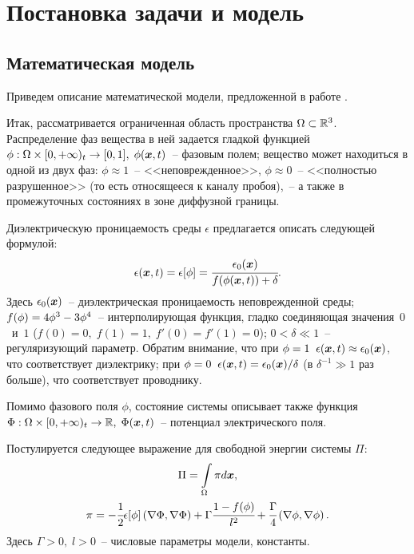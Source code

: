 
\section{Постановка задачи и модель}

\subsection{Математическая модель}

Приведем описание математической модели, предложенной в работе \cite{pitike_dielectric_breakdown}.

Итак, рассматривается ограниченная область пространства $\Omega \subset {\mathbb{R}}^3$. Распределение фаз вещества в ней задается гладкой функцией $\phi: \Omega \times [0, +\infty)_t \hm \to [0, 1], \; \phi(\vx, t)$~-- фазовым полем; вещество может находиться в одной из двух фаз: $\phi \approx 1$~-- <<неповрежденное>>, $\phi \approx 0$~-- <<полностью разрушенное>> (то есть относящееся к каналу пробоя),~-- а также в промежуточных состояниях в зоне диффузной границы.

Диэлектрическую проницаемость среды $\epsilon$ предлагается описать следующей формулой:
\begin{equation}
	\epsilon({\boldsymbol{x}}, t) = \epsilon[\phi] = \cfrac{\epsilon_0({\boldsymbol{x}})}{f(\phi({\boldsymbol{x}}, t)) + \delta} {\text{.}}
	\label{eq:epsilon}
\end{equation}
Здесь $\epsilon_0({\boldsymbol{x}})$~-- диэлектрическая проницаемость неповрежденной среды; $f(\phi) \hm = 4\phi^3 - 3\phi^4$~-- интерполирующая функция, гладко соединяющая значения~$0$~и~$1$ ($f(0) = 0, \; f(1) = 1, \; f'(0) = f'(1) = 0$); $0 < \delta \ll 1$~-- регуляризующий параметр. Обратим внимание, что при $\phi = 1 \;\; \epsilon({\boldsymbol{x}}, t) \approx \epsilon_0({\boldsymbol{x}})$, что соответствует диэлектрику; при $\phi = 0 \;\; \epsilon({\boldsymbol{x}}, t) = \epsilon_0({\boldsymbol{x}}) / \delta$ (в $\delta^{-1} \gg 1$ раз больше), что соответствует проводнику.

Помимо фазового поля $\phi$, состояние системы описывает также функция $\Phi: \Omega \times [0, +\infty)_t \to {\mathbb{R}}, \; \Phi({\boldsymbol{x}}, t)$~-- потенциал электрического поля.

Постулируется следующее выражение для свободной энергии системы $\Pi$:
\begin{gather}
	\Pi = \int \limits_\Omega \pi d {\boldsymbol{x}} {\text{,}}
	\label{eq:energy} \\
	\pi = -\cfrac{1}{2} \epsilon[\phi] \left( \nabla \Phi, \nabla \Phi \right) + \Gamma \cfrac{1 - f(\phi)}{l^2} + \cfrac{\Gamma}{4} \left( \nabla \phi, \nabla \phi \right) {\text{.}}
	\label{eq:energy_density}
\end{gather}
Здесь $\Gamma > 0, \; l > 0$~-- числовые параметры модели, константы.

